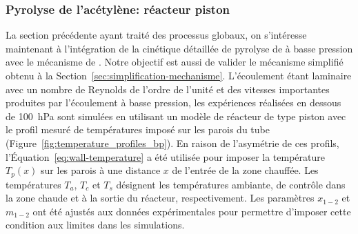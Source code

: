 \subsubsection{\label{sec:simulation-acetylene-piston}Pyrolyse de l'acétylène: réacteur piston}

La section précédente ayant traité des processus globaux, on s'intéresse maintenant à l'intégration de la cinétique détaillée de pyrolyse de  à basse pression avec le mécanisme de \citet{Norinaga2009}. Notre objectif est aussi de valider le mécanisme simplifié obtenu à la Section~\ref{sec:simplification-mechanisme}. L'écoulement étant laminaire avec un nombre de Reynolds de l'ordre de l'unité et des vitesses importantes produites par l'écoulement à basse pression, les expériences réalisées en dessous de \SI{100}{\hecto\pascal} sont simulées en utilisant un modèle de réacteur de type piston avec le profil mesuré de températures imposé sur les parois du tube (Figure~\ref{fig:temperature_profiles_bp}). En raison de l'asymétrie de ces profils, l'Équation~\ref{eq:wall-temperature} a été utilisée pour imposer la température $T_{p}(x)$ sur les parois à une distance $x$ de l'entrée de la zone chauffée. Les températures $T_{a}$, $T_{c}$ et $T_{s}$ désignent les températures ambiante, de contrôle dans la zone chaude et à la sortie du réacteur, respectivement. Les paramètres $x_{1-2}$ et $m_{1-2}$ ont été ajustés aux données expérimentales pour permettre d'imposer cette condition aux limites dans les simulations.


